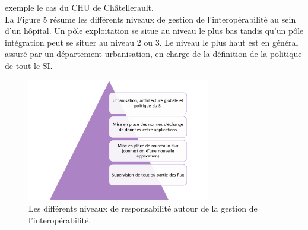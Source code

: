 			exemple le cas du CHU de Châtellerault.\\
			La Figure 5 résume les différents niveaux de gestion de l’interopérabilité au
			sein d’un hôpital. Un pôle exploitation se situe au niveau le plus bas
			tandis qu’un pôle intégration peut se situer au niveau 2 ou 3. Le niveau le
			plus haut est en général assuré par un département urbanisation, en charge
			de la définition de la politique de tout le SI.
			\begin{figure}[!h]
				\centering
				\includegraphics[width=8cm]{../img/si_1.png}
				\caption{\label{Figure 4} Les différents niveaux de responsabilité autour
				de la gestion de l'interopérabilité.}
			\end{figure}
			

